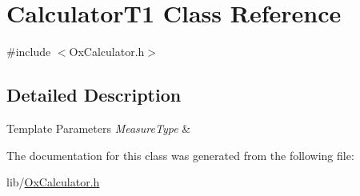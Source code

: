 \hypertarget{class_calculator_t1}{\section{Calculator\-T1 Class Reference}
\label{class_calculator_t1}
}


{\ttfamily \#include $<$Ox\-Calculator.\-h$>$}



\subsection{Detailed Description}

\begin{DoxyTemplParams}{Template Parameters}
{\em Measure\-Type} & \\
\hline
\end{DoxyTemplParams}


The documentation for this class was generated from the following file\-:\begin{DoxyCompactItemize}
\item 
lib/\hyperlink{_ox_calculator_8h}{Ox\-Calculator.\-h}\end{DoxyCompactItemize}

